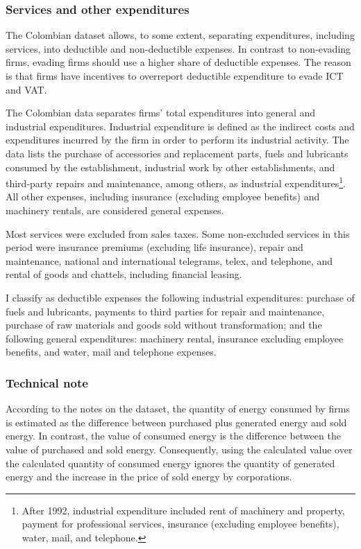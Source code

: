 \documentclass[
  12pt]{article}
\theoremstyle{definition}
\theoremstyle{remark}
\begin{document}
\subsubsection{Services and other
expenditures}\label{services-and-other-expenditures}

The Colombian dataset allows, to some extent, separating expenditures,
including services, into deductible and non-deductible expenses. In
contrast to non-evading firms, evading firms should use a higher share
of deductible expenses. The reason is that firms have incentives to
overreport deductible expenditure to evade ICT and VAT.

The Colombian data separates firms' total expenditures into general and
industrial expenditures. Industrial expenditure is defined as the
indirect costs and expenditures incurred by the firm in order to perform
its industrial activity. The data lists the purchase of accessories and
replacement parts, fuels and lubricants consumed by the establishment,
industrial work by other establishments, and third-party repairs and
maintenance, among others, as industrial expenditures\footnote{After
  1992, industrial expenditure included rent of machinery and property,
  payment for professional services, insurance (excluding employee
  benefits), water, mail, and telephone.}. All other expenses, including
insurance (excluding employee benefits) and machinery rentals, are
considered general expenses.

Most services were excluded from sales taxes. Some non-excluded services
in this period were insurance premiums (excluding life insurance),
repair and maintenance, national and international telegrams, telex, and
telephone, and rental of goods and chattels, including financial
leasing.

I classify as deductible expenses the following industrial expenditures:
purchase of fuels and lubricants, payments to third parties for repair
and maintenance, purchase of raw materials and goods sold without
transformation; and the following general expenditures: machinery
rental, insurance excluding employee benefits, and water, mail and
telephone expenses.

\subsubsection{Technical note}\label{technical-note}

According to the notes on the dataset, the quantity of energy consumed
by firms is estimated as the difference between purchased plus generated
energy and sold energy. In contrast, the value of consumed energy is the
difference between the value of purchased and sold energy. Consequently,
using the calculated value over the calculated quantity of consumed
energy ignores the quantity of generated energy and the increase in the
price of sold energy by corporations.
\end{document}
